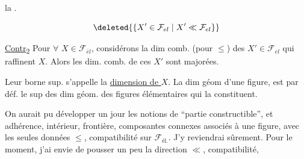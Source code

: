 la  . 

\[
\deleted{\{X'\in \mathcal{F}_{el}\mid X'\ll \mathcal{F}_{el}\}}
\]

\uline{Contr}\textsubscript{2} Pour $\forall$ $X\in \mathcal{F}_{\bar e l}$, considérons la dim comb. (pour $\leq$) des $X'\in \mathcal{F}_{el}$  qui raffinent $X$. Alors les dim. comb. de ces $X'$ sont majorées.

Leur borne sup. s'appelle la \uline{dimension  de $X$}. La dim géom d'une figure, est par déf. le sup des dim géom. des  figures élémentaires qui la constituent.


On aurait pu développer un jour les notions de ``partie constructible'', et adhérence, intérieur, frontière, composantes connexes associés à une figure, avec les seules données $\leq$, compatibilité sur   $\mathcal{F}_{\text{él.}}$.
J'y reviendrai sûrement. Pour le moment, j'ai envie de pousser  un peu  la direction $\ll$, compatibilité,

